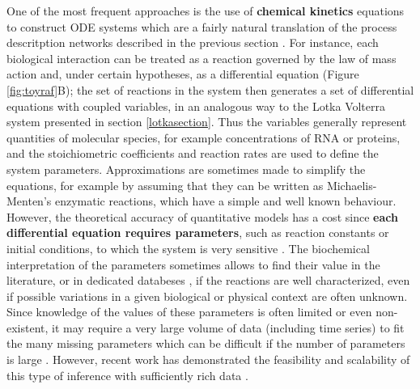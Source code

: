 \documentclass[a4paper,12pt,twoside,onecolumn,openright,final,oldfontcommands]{memoir}
\begin{document}
One of the most frequent approaches is the use of \textbf{chemical
kinetics} equations to construct ODE systems which are a fairly natural
translation of the process descritption networks described in the
previous section \citep{polynikis2009comparing}. For instance, each
biological interaction can be treated as a reaction governed by the law
of mass action and, under certain hypotheses, as a differential equation
(Figure \ref{fig:toyraf}B); the set of reactions in the system then
generates a set of differential equations with coupled variables, in an
analogous way to the Lotka Volterra system presented in section
\ref{lotkasection}. Thus the variables generally represent quantities of
molecular species, for example concentrations of RNA or proteins, and
the stoichiometric coefficients and reaction rates are used to define
the system parameters. Approximations are sometimes made to simplify the
equations, for example by assuming that they can be written as
Michaelis-Menten's enzymatic reactions, which have a simple and well
known behaviour. However, the theoretical accuracy of quantitative
models has a cost since \textbf{each differential equation requires
parameters}, such as reaction constants or initial conditions, to which
the system is very sensitive \citep{le2015quantitative}. The biochemical
interpretation of the parameters sometimes allows to find their value in
the literature, or in dedicated databeses \citep{wittig2012sabio}, if
the reactions are well characterized, even if possible variations in a
given biological or physical context are often unknown. Since knowledge
of the values of these parameters is often limited or even non-existent,
it may require a very large volume of data (including time series) to
fit the many missing parameters which can be difficult if the number of
parameters is large \citep{villaverde2014reverse}. However, recent work
has demonstrated the feasibility and scalability of this type of
inference with sufficiently rich data \citep{frohlich2018efficient}.
\end{document}
